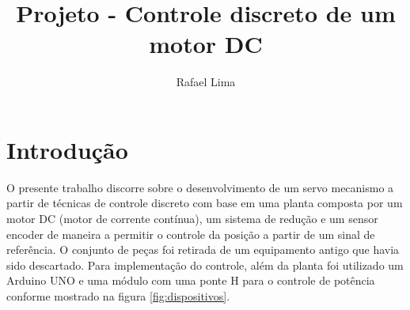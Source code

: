 \documentclass[a4paper,11pt]{article}
\title{Projeto - Controle discreto de um motor DC} %
\author{Rafael Lima}
\begin{document}

\section{Introdução}

O presente trabalho discorre sobre o desenvolvimento de um servo mecanismo a partir de técnicas de controle discreto com base em uma planta composta por um motor DC (motor de corrente contínua), um sistema de redução e um sensor encoder de maneira a permitir o controle da posição a partir de um sinal de referência. O conjunto de peças foi retirada de um equipamento antigo que havia sido descartado. Para implementação do controle, além da planta foi utilizado um Arduino UNO e uma módulo com uma ponte H para o controle de potência conforme mostrado na figura \ref{fig:dispositivos}.
\end{document}
